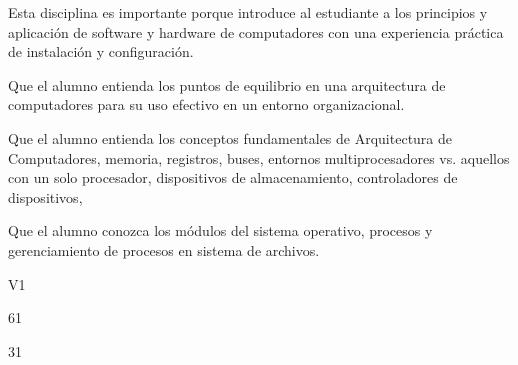 \begin{syllabus}


\begin{justification}
    Esta disciplina es importante porque introduce al estudiante a los principios y aplicación de software y hardware de computadores con una experiencia práctica de instalación y configuración.
    \end{justification}
    
    \begin{goals}
    \item Que el alumno entienda los puntos de equilibrio en una arquitectura de computadores para su uso efectivo en un entorno organizacional.
    \item Que el alumno entienda los conceptos fundamentales de Arquitectura de Computadores, memoria, registros, buses, entornos multiprocesadores vs. aquellos con un solo procesador, dispositivos de almacenamiento, controladores de dispositivos, 
    \item Que el alumno conozca los módulos del sistema operativo, procesos y gerenciamiento de procesos en sistema de archivos.
    \end{goals}
    
    \begin{outcomes}{V1}
        \item {}
        \item {}
        \item {}
        \item {}
    \end{outcomes}
    
    \begin{unit}{\LUSIXDef}{}{\LUSIXBib}{6}{1}
    
    \end{unit}
    
    \begin{unit}{\LUSEVENDef}{}{\LUSEVENBib}{3}{1}
    
    \end{unit}
    
    
    \begin{coursebibliography}
    \end{coursebibliography}
    
    \end{syllabus}
    